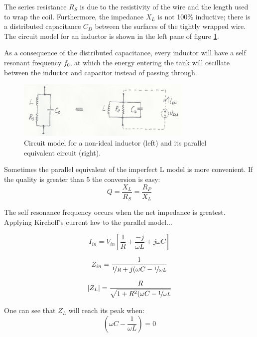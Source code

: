 \documentclass[titlepage, letterpaper, 11pt]{article}
\begin{document}
The series resistance $R_{S}$ is due to the resistivity of the
wire and the length used to wrap the coil. Furthermore, the
impedance $X_{L}$ is not 100\% inductive; there is a distributed
capacitance $C_{D}$ between the surfaces of the tightly wrapped
wire. The circuit model for an inductor is shown in the left pane of
figure \ref{tankCircuit}.

As a consequence of the distributed capacitance, every inductor
will have a self resonant frequency $f_{0}$, at which the energy
entering the tank will oscillate between the inductor and capacitor
instead of passing through.

\begin{figure}[ht]
	\centering
	\includegraphics[width=0.75\textwidth]
		{figures/tankCircuit.png}
	\caption{
		Circuit model for a non-ideal inductor (left) and its
		parallel equivalent circuit (right).
	}
	\label{tankCircuit}
\end{figure}

Sometimes the parallel equivalent of the imperfect L model is more
convenient. If the quality is greater than 5 the conversion is easy:
\begin{equation}
Q=\frac{X_{L}}{R_{S}}=\frac{R_{P}}{X_{L}}
\end{equation}

The self resonance frequency occurs when the net impedance is
greatest. Applying Kirchoff's current law to the parallel model...

\begin{equation*}
I_{in}=V_{in}\left[
\frac{1}{R}+\frac{-j}{\omega L}+j\omega C\right]
\end{equation*}

\begin{equation*}
Z_{in}=\frac{1}{\nicefrac{1}{R}+j(\omega C-\nicefrac{1}{\omega L}}
\end{equation*}

\begin{equation}
|Z_{L}|=\frac{R}{\sqrt{1+R^{2}(\omega C-\nicefrac{1}{\omega L}}}
\label{tankImpedance}
\end{equation}

One can see that $Z_{L}$ will reach its peak when:
\begin{equation*}
\left(\omega C-\frac{1}{\omega L}\right)=0
\label{resonantFrequencyEq}
\end{equation*}
\end{document}
